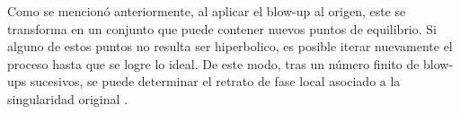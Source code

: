 %
%
%
%
%
%
%

Como se mencionó anteriormente, al aplicar el blow-up al origen, este se transforma en un conjunto que puede contener nuevos puntos de equilibrio. Si alguno de estos puntos no resulta ser hiperbolico, es posible iterar nuevamente el proceso hasta que se logre lo ideal. De este modo, tras un número finito de blow-ups sucesivos, se puede determinar el retrato de fase local asociado a la singularidad original \cite[p. I]{Dumortier2006}.

